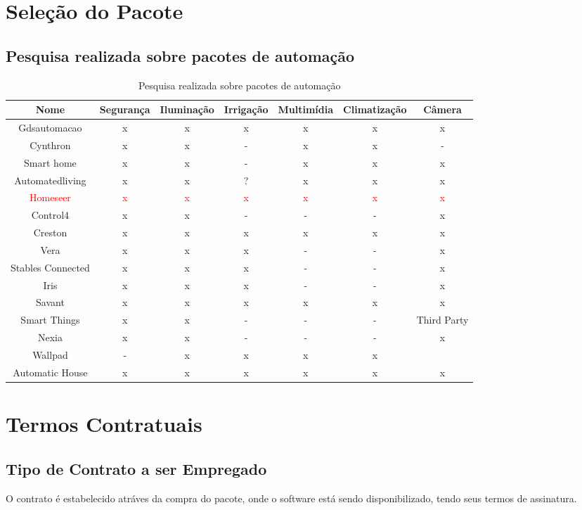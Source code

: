 \section{Seleção do Pacote}

\subsection{Pesquisa realizada sobre pacotes de automação}

\begin{table}[H]

\begin{sideways}
\begin{tabular}{|c|c|c|c|c|c|c|}
\hline 
\textbf{Nome} & \textbf{Segurança} & \textbf{Iluminação} & \textbf{Irrigação} & \textbf{Multimídia} & \textbf{Climatização} & \textbf{Câmera}\tabularnewline
\hline 
\hline 
Gdsautomacao & x & x & x & x & x & x\tabularnewline
\hline 
Cynthron & x & x & - & x & x & -\tabularnewline
\hline 
Smart home & x & x & - & x & x & x\tabularnewline
\hline 
Automatedliving & x & x & ? & x & x & x\tabularnewline
\hline 
\textcolor{red}{Homeseer} & \textcolor{red}{x} & \textcolor{red}{x} & \textcolor{red}{x} & \textcolor{red}{x} & \textcolor{red}{x} & \textcolor{red}{x}\tabularnewline
\hline 
Control4 & x & x & - & - & - & x\tabularnewline
\hline 
Creston & x & x & x & x & x & x\tabularnewline
\hline 
Vera & x & x & x & - & - & x\tabularnewline
\hline 
Stables Connected & x & x & x & - & - & x\tabularnewline
\hline 
Iris & x & x & x & - & - & x\tabularnewline
\hline 
Savant & x & x & x & x & x & x\tabularnewline
\hline 
Smart Things & x & x & - & - & - & Third Party\tabularnewline
\hline 
Nexia & x & x & - & - & - & x\tabularnewline
\hline 
Wallpad & - & x & x & x & x & \tabularnewline
\hline 
Automatic House & x & x & x & x & x & x\tabularnewline
\hline 
\end{tabular}
\end{sideways}
\caption{Pesquisa realizada sobre pacotes de automação}
\end{table}
\section{Termos Contratuais}

\subsection{Tipo de Contrato a ser Empregado}
	O contrato é estabelecido atráves da compra do pacote, onde o software está sendo disponibilizado,
	tendo seus termos de assinatura.

